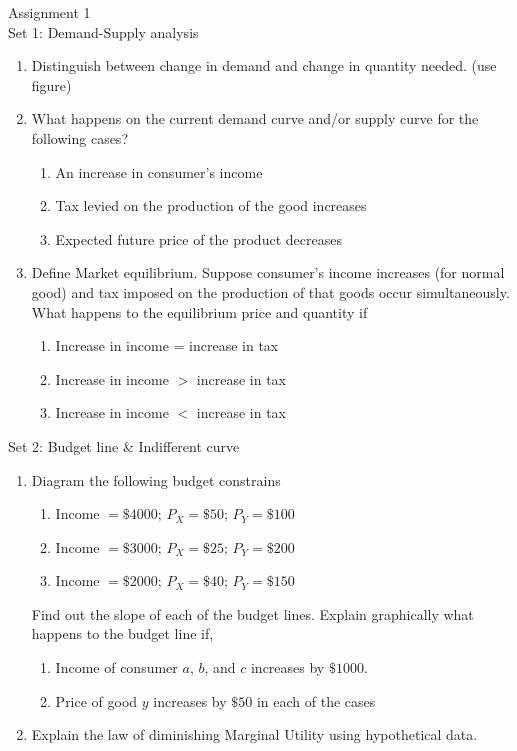 \documentclass[12pt]{article}
\begin{document}
{\large Assignment 1}\\
{\large Set 1: Demand-Supply analysis}
\begin{enumerate}
	\item Distinguish between change in demand and change in quantity needed. (use figure)
	\item What happens on the current demand curve and/or supply curve for the following cases?
	      \begin{enumerate}
		      \item An increase in consumer's income
		      \item Tax levied on the production of the good increases
		      \item Expected future price of the product decreases
	      \end{enumerate}
	\item Define Market equilibrium. Suppose consumer's income increases (for normal good) and tax imposed on the production of that goods occur simultaneously. What happens to the equilibrium price and quantity if
	      \begin{enumerate}
		      \item Increase in income = increase in tax
		      \item Increase in income $ > $ increase in tax
		      \item Increase in income $ < $ increase in tax
	      \end{enumerate}
\end{enumerate}
{\large Set 2: Budget line \& Indifferent curve}
\begin{enumerate}
	\item Diagram the following budget constrains
	      \begin{enumerate}[label=\alph*.]
		      \item Income $=\$4000;\,P_X=\$50;\,P_Y=\$100$
		      \item Income $=\$3000;\,P_X=\$25;\,P_Y=\$200$
		      \item Income $=\$2000;\,P_X=\$40;\,P_Y=\$150$
	      \end{enumerate}
	      Find out the slope of each of the budget lines. Explain graphically what happens to the budget line if,
	      \begin{enumerate}[label=(\roman*)]
		      \item Income of consumer $ a $, $ b $, and $ c $ increases by $\$1000$.
		      \item Price of good $ y $ increases by $\$50$ in each of the cases
	      \end{enumerate}
	\item Explain the law of diminishing Marginal Utility using hypothetical data.
\end{enumerate}
\end{document}
